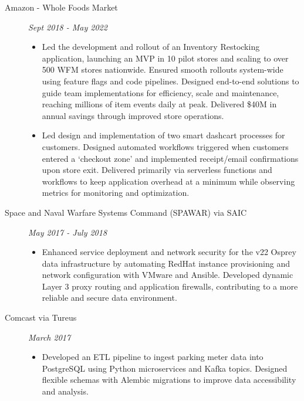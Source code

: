 \documentclass[11pt]{article}
\begin{document}
\begin{description}
\begin{description}
        \item[Amazon - Whole Foods Market] \hfill \textit{Sept 2018 - May 2022}
        \begin{itemize}[leftmargin=*]
            \item Led the development and rollout of an Inventory Restocking application,
            launching an MVP in 10 pilot stores and scaling to over 500 WFM stores nationwide.
            Ensured smooth rollouts system-wide using feature flags and code pipelines.
            Designed end-to-end solutions to guide team implementations for efficiency, scale and
            maintenance, reaching millions of item events daily at peak. Delivered \$40M in annual savings
            through improved store operations.

            \item Led design and implementation of two smart dashcart processes for customers.
            Designed automated workflows triggered when customers entered a ‘checkout zone’ and
            implemented receipt/email confirmations upon store exit. Delivered primarily via serverless
            functions and workflows to keep application overhead at a minimum while observing metrics
            for monitoring and optimization.
        \end{itemize}

        \item[Space and Naval Warfare Systems Command (SPAWAR) via SAIC] \hfill \textit{May 2017 - July 2018}
        \begin{itemize}[leftmargin=*]
        \item Enhanced service deployment and network security for the v22 Osprey data
            infrastructure by automating RedHat instance provisioning and network configuration
            with VMware and Ansible. Developed dynamic Layer 3 proxy routing and application
            firewalls, contributing to a more reliable and secure data environment.
        \end{itemize}

        \item[Comcast via Tureus] \hfill \textit{March 2017}
        \begin{itemize}[leftmargin=*]
            \item Developed an ETL pipeline to ingest parking meter data into
            PostgreSQL using Python microservices and Kafka topics. Designed flexible
            schemas with Alembic migrations to improve data accessibility
            and analysis.
        \end{itemize}


\end{description}
\end{description}
\end{document}

